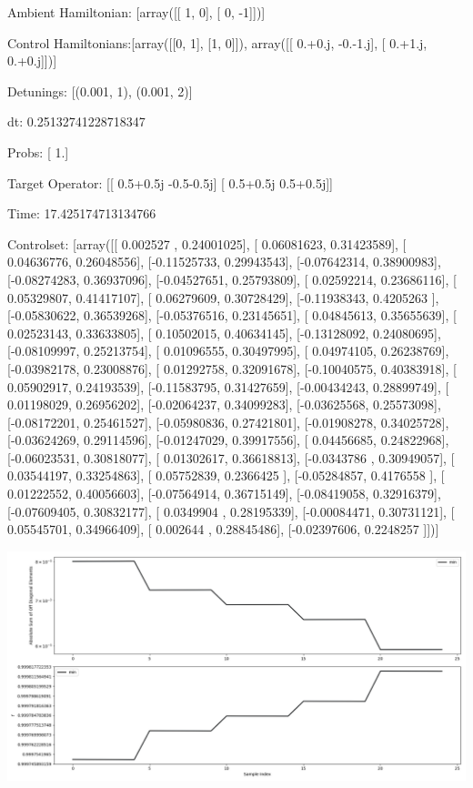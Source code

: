 \documentclass{article}
\begin{document}
    

\newpage

Ambient Hamiltonian: [array([[ 1,  0],
       [ 0, -1]])]

Control Hamiltonians:[array([[0, 1],
       [1, 0]]), array([[ 0.+0.j, -0.-1.j],
       [ 0.+1.j,  0.+0.j]])]

Detunings: [(0.001, 1), (0.001, 2)]

 dt: 0.25132741228718347

Probs: [ 1.]

Target Operator: [[ 0.5+0.5j -0.5-0.5j]
 [ 0.5+0.5j  0.5+0.5j]]

Time: 17.425174713134766

Controlset: [array([[ 0.002527  ,  0.24001025],
       [ 0.06081623,  0.31423589],
       [ 0.04636776,  0.26048556],
       [-0.11525733,  0.29943543],
       [-0.07642314,  0.38900983],
       [-0.08274283,  0.36937096],
       [-0.04527651,  0.25793809],
       [ 0.02592214,  0.23686116],
       [ 0.05329807,  0.41417107],
       [ 0.06279609,  0.30728429],
       [-0.11938343,  0.4205263 ],
       [-0.05830622,  0.36539268],
       [-0.05376516,  0.23145651],
       [ 0.04845613,  0.35655639],
       [ 0.02523143,  0.33633805],
       [ 0.10502015,  0.40634145],
       [-0.13128092,  0.24080695],
       [-0.08109997,  0.25213754],
       [ 0.01096555,  0.30497995],
       [ 0.04974105,  0.26238769],
       [-0.03982178,  0.23008876],
       [ 0.01292758,  0.32091678],
       [-0.10040575,  0.40383918],
       [ 0.05902917,  0.24193539],
       [-0.11583795,  0.31427659],
       [-0.00434243,  0.28899749],
       [ 0.01198029,  0.26956202],
       [-0.02064237,  0.34099283],
       [-0.03625568,  0.25573098],
       [-0.08172201,  0.25461527],
       [-0.05980836,  0.27421801],
       [-0.01908278,  0.34025728],
       [-0.03624269,  0.29114596],
       [-0.01247029,  0.39917556],
       [ 0.04456685,  0.24822968],
       [-0.06023531,  0.30818077],
       [ 0.01302617,  0.36618813],
       [-0.0343786 ,  0.30949057],
       [ 0.03544197,  0.33254863],
       [ 0.05752839,  0.2366425 ],
       [-0.05284857,  0.4176558 ],
       [ 0.01222552,  0.40056603],
       [-0.07564914,  0.36715149],
       [-0.08419058,  0.32916379],
       [-0.07609405,  0.30832177],
       [ 0.0349904 ,  0.28195339],
       [-0.00084471,  0.30731121],
       [ 0.05545701,  0.34966409],
       [ 0.002644  ,  0.28845486],
       [-0.02397606,  0.2248257 ]])]
\begin{center}
\includegraphics[scale=.9]{report_pickled_controls195/control_dpn_all.png}

\end{center}
\end{document}
